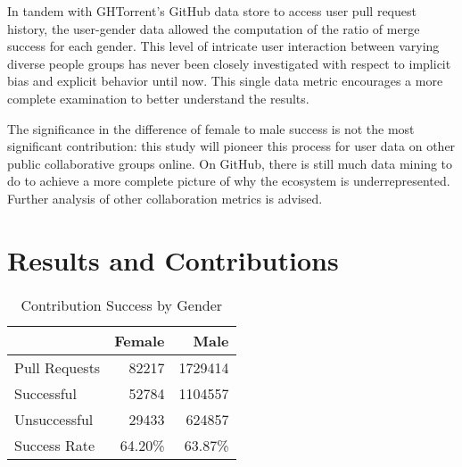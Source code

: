 \documentclass[10pt]{sigplanconf}
\begin{document}
In tandem with GHTorrent's GitHub data store to
access user pull request history, the user-gender data allowed the computation of
the ratio of merge success for each gender. This level of intricate user interaction
between varying diverse people groups has never been closely investigated with
respect to implicit bias and explicit behavior until
now. This single data metric encourages a more complete examination to better
understand the results.

The significance in the difference of female to male success is not the most
significant contribution: this study will pioneer this process for user data on
other public collaborative groups online.
On GitHub, there is still much data mining to do to achieve a more complete
picture of why the ecosystem is underrepresented. Further analysis of other
collaboration metrics is advised.



\section{Results and Contributions}

\begin{table}[h]
  \begin{center}
    \caption{Contribution Success by Gender}
    \begin{tabular}{l|r|r}
      & Female & Male\\ \hline
      Pull Requests & \num{82217} & \num{1729414} \\ \hline
      Successful  & \num{52784} & \num{1104557} \\ \hline
      Unsuccessful  & \num{29433} & \num{624857} \\ \hline
      Success Rate & \num{64.20}\% & \num{63.87}\% \\ \hline
    \end{tabular}
  \end{center}
\end{table}
\end{document}
